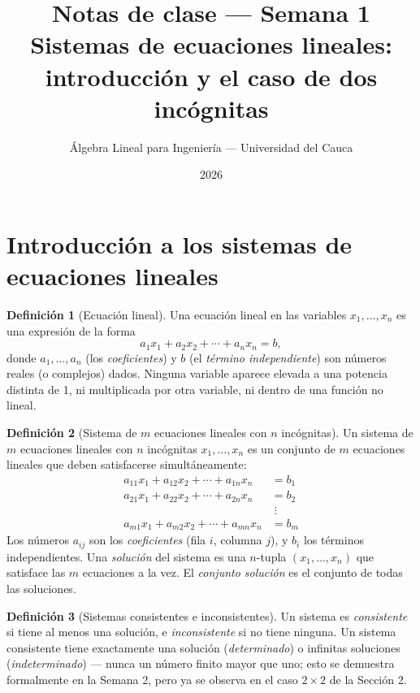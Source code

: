 \documentclass[11pt,letterpaper]{article}
\title{\textcolor{unicaucaverde}{\Large Notas de clase --- Semana 1}\\[4pt]
  \large Sistemas de ecuaciones lineales: introducción y el caso de dos incógnitas}
\author{Álgebra Lineal para Ingeniería --- Universidad del Cauca}
\date{2026}
\theoremstyle{definition}
\newtheorem{definicion}{Definición}[section]
\begin{document}
\maketitle
\tableofcontents

\section{Introducción a los sistemas de ecuaciones lineales}

\begin{definicion}[Ecuación lineal]
Una ecuación lineal en las variables $x_1,\dots,x_n$ es una expresión de la forma
\[
  a_1 x_1 + a_2 x_2 + \cdots + a_n x_n = b,
\]
donde $a_1,\dots,a_n$ (los \emph{coeficientes}) y $b$ (el \emph{término independiente}) son
números reales (o complejos) dados. Ninguna variable aparece elevada a una potencia distinta de
1, ni multiplicada por otra variable, ni dentro de una función no lineal.
\end{definicion}

\begin{definicion}[Sistema de $m$ ecuaciones lineales con $n$ incógnitas]
Un sistema de $m$ ecuaciones lineales con $n$ incógnitas $x_1,\dots,x_n$ es un conjunto de $m$
ecuaciones lineales que deben satisfacerse simultáneamente:
\[
\begin{aligned}
  a_{11}x_1 + a_{12}x_2 + \cdots + a_{1n}x_n &= b_1 \\
  a_{21}x_1 + a_{22}x_2 + \cdots + a_{2n}x_n &= b_2 \\
  &\;\vdots \\
  a_{m1}x_1 + a_{m2}x_2 + \cdots + a_{mn}x_n &= b_m
\end{aligned}
\]
Los números $a_{ij}$ son los \emph{coeficientes} (fila $i$, columna $j$), y $b_i$ los términos
independientes. Una \emph{solución} del sistema es una $n$-tupla $(x_1,\dots,x_n)$ que satisface
las $m$ ecuaciones a la vez. El \emph{conjunto solución} es el conjunto de todas las soluciones.
\end{definicion}

\begin{definicion}[Sistemas consistentes e inconsistentes]
Un sistema es \emph{consistente} si tiene al menos una solución, e \emph{inconsistente} si no
tiene ninguna. Un sistema consistente tiene exactamente una solución (\emph{determinado}) o
infinitas soluciones (\emph{indeterminado}) --- nunca un número finito mayor que uno; esto se
demuestra formalmente en la Semana 2, pero ya se observa en el caso $2\times 2$ de la Sección 2.
\end{definicion}
\end{document}
